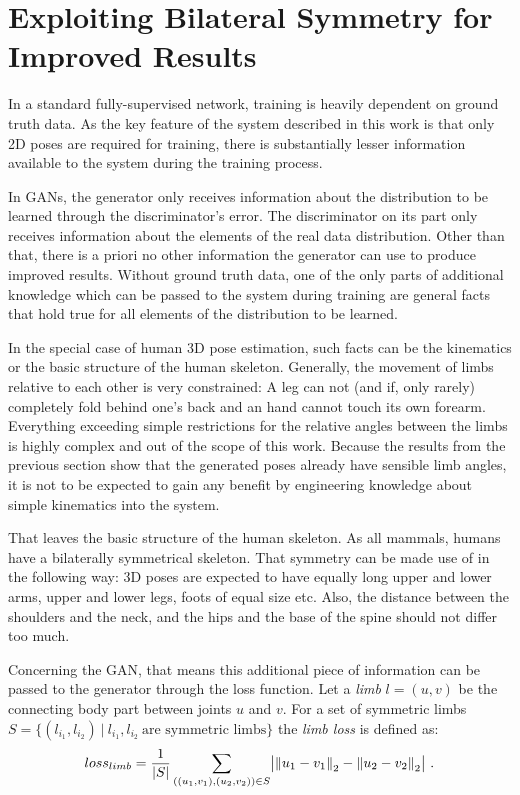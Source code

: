 \section{
	Exploiting Bilateral Symmetry for Improved Results}


In a standard fully-supervised network, training is heavily dependent on ground truth data.
As the key feature of the system described in this work is that only 2D poses are required for training, there is substantially lesser information available to the system during the training process.

In GANs, the generator only receives information about the distribution to be learned through the discriminator's error.
The discriminator on its part only receives information about the elements of the real data distribution.
Other than that, there is a priori no other information the generator can use to produce improved results.
Without ground truth data, one of the only parts of additional knowledge which can be passed to the system during training are general facts that hold true for all elements of the distribution to be learned.

In the special case of human 3D pose estimation, such facts can be the kinematics or the basic structure of the human skeleton.
Generally, the movement of limbs relative to each other is very constrained:
A leg can not (and if, only rarely) completely fold behind one's back and an hand cannot touch its own forearm.
Everything exceeding simple restrictions for the relative angles between the limbs is highly complex and out of the scope of this work.
Because the results from the previous section show that the generated poses already have sensible limb angles, it is not to be expected to gain any benefit by engineering knowledge about simple kinematics into the system.

That leaves the basic structure of the human skeleton.
As all mammals, humans have a bilaterally symmetrical skeleton.
That symmetry can be made use of in the following way:
3D poses are expected to have equally long upper and lower arms, upper and lower legs, foots of equal size etc.
Also, the distance between the shoulders and the neck, and the hips and the base of the spine should not differ too much.

Concerning the GAN, that means this additional piece of information can be passed to the generator through the loss function.
Let a \emph{limb} $l = (u, v)$ be the connecting body part between joints $u$ and $v$.
For a set of symmetric limbs $S = \{(l_{i_1}, l_{i_2})~|~ l_{i_1}, l_{i_2}\ \text{are symmetric limbs} \}$ the \emph{limb loss} is defined as:
\begin{equation}
loss_{limb} = \frac{1}{|S|}\sum_{((u_1, v_1), (u_2, v_2)) \in S} \bigl\lvert \norm{u_1 - v_1}_2 - \norm{u_2 - v_2}_2 \bigr\rvert \ .
\end{equation}

